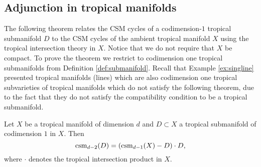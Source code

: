 \subsection{Adjunction in tropical manifolds}

The following theorem relates the CSM cycles of a codimension-$1$ tropical submanifold $D$ to the CSM cycles of the ambient tropical manifold $X$ using the tropical intersection theory in $X$.  
Notice that we do not require that $X$ be compact. 
To prove the theorem we restrict to codimension one tropical  submanifolds from Definition \ref{def:submanifold}.
Recall that Example \ref{ex:singline} presented tropical manifolds (lines) which are also codimension one  tropical subvarieties of tropical manifolds  which do  not satisfy the following theorem, due to the fact that they do not satisfy the compatibility condition to be a tropical submanifold. 


\begin{thm}\label{thm:Adjunction}
Let $X$ be a tropical manifold  of dimension $d$ and $D \subset X$ a tropical submanifold of codimension $1$ in $X$. 
Then 
$$\operatorname{csm}_{d-2}(D) = (\operatorname{csm}_{d-1}(X) -  D )\cdot D,$$
where $\cdot$ denotes the tropical intersection product in $X$. 
\end{thm}


